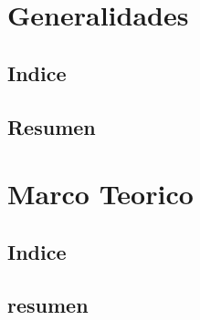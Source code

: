 \documentclass[12pt]{book}
\begin{document}
\chapter{Generalidades}
\section*{Indice}
\section{Resumen}
\chapter{Marco Teorico}
\section*{Indice}
\section{resumen}
\end{document}
